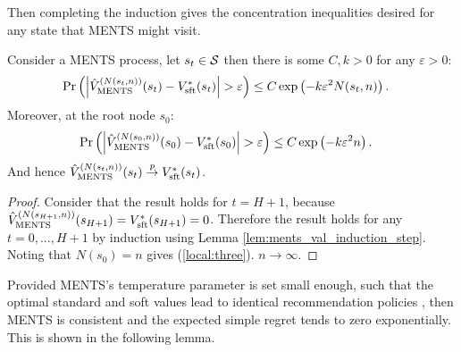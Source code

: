         
    
    Then completing the induction gives the concentration inequalities desired for any state that MENTS might visit.
    \begin{theorem} \label{thrm:ments_val_converge}
        Consider a MENTS process, let $s_t\in\mathcal{S}$ then there is some $C,k>0$ for any $\varepsilon>0$:
        \begin{align}
            \Pr\left(\left| {\hat{V}^{(N(s_{t},n))}_{{\textnormal{MENTS}}}}(s_{t}) - V_{{\textnormal{sft}}}^*(s_{t}) \right| > \varepsilon \right) 
                &\leq C\exp\left( -k\varepsilon^2 N(s_{t},n) \right).
        \end{align}
        Moreover, at the root node $s_0$:
        \begin{align}
            \Pr\left(\left| {\hat{V}^{(N(s_{0},n))}_{{\textnormal{MENTS}}}}(s_{0}) - V_{{\textnormal{sft}}}^*(s_{0}) \right| > \varepsilon \right) 
                &\leq C\exp\left( -k\varepsilon^2 n \right). \label{local:three}
        \end{align}
        And hence ${\hat{V}^{(N(s_{t},n))}_{{\textnormal{MENTS}}}}(s_{t}) \overset{p}{\to} V_{{\textnormal{sft}}}^*(s_{t})$.
    \end{theorem}
    \begin{proof}
        Consider that the result holds for $t=H+1$, because ${\hat{V}^{(N(s_{H+1},n))}_{{\textnormal{MENTS}}}}(s_{H+1})=V_{{\textnormal{sft}}}^*(s_{H+1})=0$. Therefore the result holds for any $t=0,...,H+1$ by induction using Lemma \ref{lem:ments_val_induction_step}. Noting that $N(s_0)=n$ gives (\ref{local:three}). $n\rightarrow\infty$. 
    \end{proof}










    Provided MENTS's temperature parameter is set small enough, such that the optimal standard and soft values lead to identical recommendation policies , then MENTS is consistent and the expected simple regret tends to zero exponentially. This is shown in the following lemma.
        
